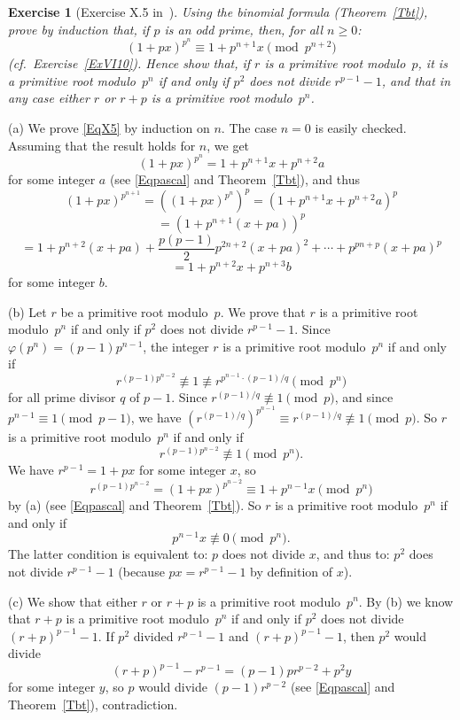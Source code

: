 \documentclass[12pt,letterpaper]{article}
\newtheorem{exer}[thm]{Exercise}
\theoremstyle{definition}
\begin{document}
\begin{exer}[Exercise X.5 in~\cite{weil1979}]\label{ExX5}
Using the binomial formula (Theorem~\ref{Tbt}), prove by induction that, if $p$ is an odd prime, then, for all $n\ge 0$:
\begin{equation}\label{EqX5}
(1+px)^{p^n}\equiv 1+p^{n+1}x \pmod{p^{n+2}}
\end{equation} 
(cf.\ Exercise~\ref{ExVI10}). Hence show that, if $r$ is a primitive root modulo~$p$, it is a primitive root modulo~$p^n$ if and only if $p^2$ does not divide $r^{p-1}-1$, and that in any case either $r$ or $r+p$ is a primitive root modulo~$p^n$.
\end{exer}

(a) We prove \eqref{EqX5} by induction on $n$. The case $n=0$ is easily checked. Assuming that the result holds for $n$, we get 
$$
(1+px)^{p^n} = 1+p^{n+1}x + p^{n+2}a
$$ 
for some integer $a$ (see \eqref{Eqpascal} and Theorem~\ref{Tbt}), and thus 
$$
(1+px)^{p^{n+1}} = ((1+px)^{p^n})^p = (1+p^{n+1}x+p^{n+2}a)^p
$$ 
$$
= (1+p^{n+1}(x+pa))^p$$ 
$$
= 1+p^{n+2}(x+pa)+\frac{p(p-1)}{2}p^{2n+2}(x+pa)^2+\cdots+p^{pn+p}(x+pa)^p
$$ 
$$
=1+p^{n+2}x+p^{n+3}b
$$ 
for some integer $b$. 

(b) Let $r$ be a primitive root modulo~$p$. We prove that $r$ is a primitive root modulo~$p^n$ if and only if $p^2$ does not divide $r^{p-1}-1$. Since $\varphi(p^n)=(p-1)p^{n-1}$, the integer $r$ is a primitive root modulo~$p^n$ if and only if 
$$
r^{(p-1)p^{n-2}} \not\equiv 1 \not\equiv r^{p^{n-1}\cdot(p-1)/q} \pmod{p^n}
$$ 
for all prime divisor $q$ of $p-1$. Since $r^{(p-1)/q} \not\equiv 1 \pmod{p}$, and since $p^{n-1} \equiv 1 \pmod{p-1}$, we have $(r^{(p-1)/q})^{p^{n-1}} \equiv r^{(p-1)/q} \not\equiv 1 \pmod{p}$. So $r$ is a primitive root modulo~$p^n$ if and only if 
$$
r^{(p-1)p^{n-2}} \not\equiv 1 \pmod{p^n}.
$$ 
We have $r^{p-1}=1+px$ for some integer $x$, so 
$$
r^{(p-1)p^{n-2}} = (1+px)^{p^{n-2}} \equiv 1+p^{n-1}x \pmod{p^n}
$$ 
by (a) (see \eqref{Eqpascal} and Theorem~\ref{Tbt}). So $r$ is a primitive root modulo~$p^n$ if and only if 
$$
p^{n-1}x \not\equiv 0 \pmod{p^n}.
$$ 
The latter condition is equivalent to: $p$ does not divide $x$, and thus to: $p^2$ does not divide $r^{p-1}-1$ (because $px=r^{p-1}-1$ by definition of $x$). 

(c) We show that either $r$ or $r+p$ is a primitive root modulo~$p^n$. By (b) we know that $r+p$ is a primitive root modulo~$p^n$ if and only if $p^2$ does not divide $(r+p)^{p-1}-1$. If $p^2$ divided $r^{p-1}-1$ and $(r+p)^{p-1}-1$, then $p^2$ would divide 
$$
(r+p)^{p-1}-r^{p-1}=(p-1)pr^{p-2}+p^2y
$$ 
for some integer $y$, so $p$ would divide $(p-1)r^{p-2}$ (see \eqref{Eqpascal} and Theorem~\ref{Tbt}), contradiction. 
\end{document}
